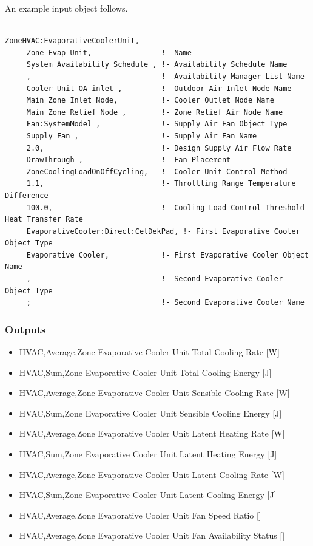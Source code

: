 An example input object follows.

\begin{lstlisting}

ZoneHVAC:EvaporativeCoolerUnit,
     Zone Evap Unit,                !- Name
     System Availability Schedule , !- Availability Schedule Name
     ,                              !- Availability Manager List Name
     Cooler Unit OA inlet ,         !- Outdoor Air Inlet Node Name
     Main Zone Inlet Node,          !- Cooler Outlet Node Name
     Main Zone Relief Node ,        !- Zone Relief Air Node Name
     Fan:SystemModel ,              !- Supply Air Fan Object Type
     Supply Fan ,                   !- Supply Air Fan Name
     2.0,                           !- Design Supply Air Flow Rate
     DrawThrough ,                  !- Fan Placement
     ZoneCoolingLoadOnOffCycling,   !- Cooler Unit Control Method
     1.1,                           !- Throttling Range Temperature Difference
     100.0,                         !- Cooling Load Control Threshold Heat Transfer Rate
     EvaporativeCooler:Direct:CelDekPad, !- First Evaporative Cooler Object Type
     Evaporative Cooler,            !- First Evaporative Cooler Object Name
     ,                              !- Second Evaporative Cooler Object Type
     ;                              !- Second Evaporative Cooler Name
\end{lstlisting}

\subsubsection{Outputs}\label{outputs-4-021}

\begin{itemize}
\item
  HVAC,Average,Zone Evaporative Cooler Unit Total Cooling Rate {[}W{]}
\item
  HVAC,Sum,Zone Evaporative Cooler Unit Total Cooling Energy {[}J{]}
\item
  HVAC,Average,Zone Evaporative Cooler Unit Sensible Cooling Rate {[}W{]}
\item
  HVAC,Sum,Zone Evaporative Cooler Unit Sensible Cooling Energy {[}J{]}
\item
  HVAC,Average,Zone Evaporative Cooler Unit Latent Heating Rate {[}W{]}
\item
  HVAC,Sum,Zone Evaporative Cooler Unit Latent Heating Energy {[}J{]}
\item
  HVAC,Average,Zone Evaporative Cooler Unit Latent Cooling Rate {[}W{]}
\item
  HVAC,Sum,Zone Evaporative Cooler Unit Latent Cooling Energy {[}J{]}
\item
  HVAC,Average,Zone Evaporative Cooler Unit Fan Speed Ratio {[]}
\item
  HVAC,Average,Zone Evaporative Cooler Unit Fan Availability Status {[]}
\end{itemize}

